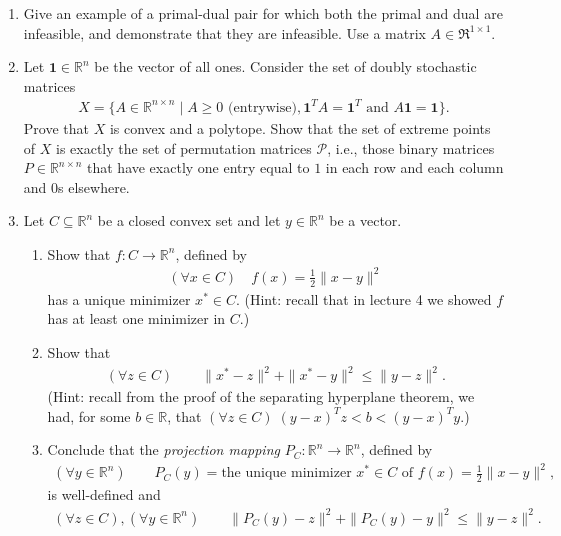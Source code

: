 \documentclass[11pt]{article}
\newcommand{\RR}{\mathbb{R}}
\begin{document}

\begin{enumerate}

\item Give an example of a primal-dual pair for which both the
primal and dual are infeasible, and demonstrate that they are
infeasible.  Use a matrix $A \in \Re^{1 \times 1}$.

\item Let $\mathbf{1} \in \RR^n$ be the vector of all ones. Consider the set of doubly stochastic matrices
\begin{align*}
X = \{A \in \RR^{n\times n} \mid  A \geq 0 \text{ (entrywise)}, \mathbf{1}^TA = \mathbf{1}^T \text{ and } A\mathbf{1} = \mathbf{1}\}.
\end{align*}
Prove that $X$ is convex and a polytope. Show that the set of extreme points of $X$ is exactly the set of permutation matrices $\mathcal{P}$, i.e., those binary matrices $P \in \RR^{n \times n}$ that have exactly one entry equal to $1$ in each row and each column and $0$s elsewhere. 

\item Let $C \subseteq \RR^n$ be a closed convex set and let $y \in \RR^n$ be a vector. 
\begin{enumerate}
\item Show that $f : C \rightarrow \RR^n$, defined by
\begin{align*}
\left(\forall x \in C\right)\quad  f(x)  = \frac{1}{2}\|x - y\|^2
\end{align*}
has a unique minimizer $x^\ast \in C$. (Hint: recall that in lecture 4 we showed $f$ has at least one minimizer in $C$.) 
\item Show that 
\begin{align*}
\left(\forall z \in C\right) \qquad \|x^\ast - z\|^2 + \|x^\ast - y\|^2 \leq \| y - z\|^2.
\end{align*}
(Hint: recall from the proof of the separating hyperplane theorem, we had, for some $b \in \RR$, that $\left(\forall z \in C\right) \; (y- x)^T z < b < (y - x)^T y.$) 
\item Conclude that the \textit{projection mapping} $P_C : \RR^n \rightarrow \RR^n$, defined by
\begin{align*}
\left(\forall y \in \RR^n\right) \qquad P_C(y) = \text{the unique minimizer $x^\ast \in C$ of $f(x) = \frac{1}{2} \|x - y\|^2$},
\end{align*}
is well-defined and
\begin{align*}
\left(\forall z \in C\right),\left(\forall y \in \RR^n\right) \qquad \|P_C(y) - z\|^2 + \|P_C(y) - y\|^2 \leq \|y - z\|^2.
\end{align*}
\end{enumerate}


\end{enumerate}
\end{document}

